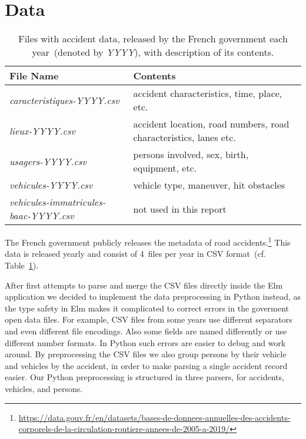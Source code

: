 \section{Data}
\label{data}
\begin{table}
    \caption{Files with accident data, released by the French government each year~(denoted by \textit{YYYY}), with description of its contents.}
    \label{table-files}
    \begin{tabularx}{\linewidth}{lX}
        \toprule
        \textbf{File Name} & \textbf{Contents} \\
        \midrule
        \textit{caracteristiques-YYYY.csv} & accident characteristics, time, place, etc. \\
        \textit{lieux-YYYY.csv} & accident location, road numbers, road characteristics, lanes etc. \\
        \textit{usagers-YYYY.csv} & persons involved, sex, birth, equipment, etc. \\
        \textit{vehicules-YYYY.csv} & vehicle type, maneuver, hit obstacles \\
        \textit{vehicules-immatricules-baac-YYYY.csv} & not used in this report \\
        \bottomrule
    \end{tabularx}
\end{table}
The French government publicly releases the metadata of road accidents.\footnote{\url{https://data.gouv.fr/en/datasets/bases-de-donnees-annuelles-des-accidents-corporels-de-la-circulation-routiere-annees-de-2005-a-2019/}}
This data is released yearly and consist of 4~files per year in CSV format~(cf. Table~\ref{table-files}).

After first attempts to parse and merge the CSV files directly inside the Elm application we decided to implement the data preprocessing in Python instead, as the type safety in Elm makes it complicated to correct errors in the goverment open data files. For example, CSV files from some years use different separators and even different file encodings. Also some fields are named differently or use different number formats. In Python such errors are easier to debug and work around. By preprocessing the CSV files we also group persons by their vehicle and vehicles by the accident, in order to make parsing a single accident record easier. Our Python preprocessing is structured in three parsers, for accidents, vehicles, and persons.



